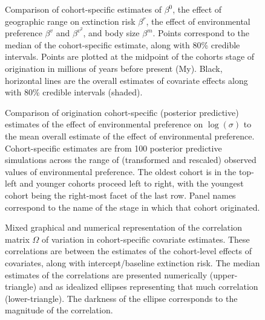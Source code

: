 \documentclass[11pt]{article}
\begin{document}
\begin{figure}[ht]
  \centering
  \caption{Comparison of cohort-specific estimates of \(\beta^{0}\), the effect of geographic range on extinction risk \(\beta^{r}\), the effect of environmental preference \(\beta^{v}\) and \(\beta^{v^{2}}\), and body size \(\beta^{m}\). Points correspond to the median of the cohort-specific estimate, along with 80\% credible intervals. Points are plotted at the midpoint of the cohorts stage of origination in millions of years before present (My). Black, horizontal lines are the overall estimates of covariate effects along with 80\% credible intervals (shaded).}
  \label{fig:cohort_series}
\end{figure}

\begin{figure}[ht]
  \centering
  \caption{Comparison of origination cohort-specific (posterior predictive) estimates of the effect of environmental preference on \(\log(\sigma)\) to the mean overall estimate of the effect of environmental preference. Cohort-specific estimates are from 100 posterior predictive simulations across the range of (transformed and rescaled) observed values of environmental preference. The oldest cohort is in the top-left and younger cohorts proceed left to right, with the youngest cohort being the right-most facet of the last row. Panel names correspond to the name of the stage in which that cohort originated.}
  \label{fig:env_cohort}
\end{figure}

\begin{figure}[ht]
  \centering
  \caption{Mixed graphical and numerical representation of the correlation matrix \(\Omega\) of variation in cohort-specific covariate estimates. These correlations are between the estimates of the cohort-level effects of covariates, along with intercept/baseline extinction risk. The median estimates of the correlations are presented numerically (upper-triangle) and as idealized ellipses representing that much correlation (lower-triangle). The darkness of the ellipse corresponds to the magnitude of the correlation.}
  \label{fig:cor_posterior}
\end{figure}
\end{document}
